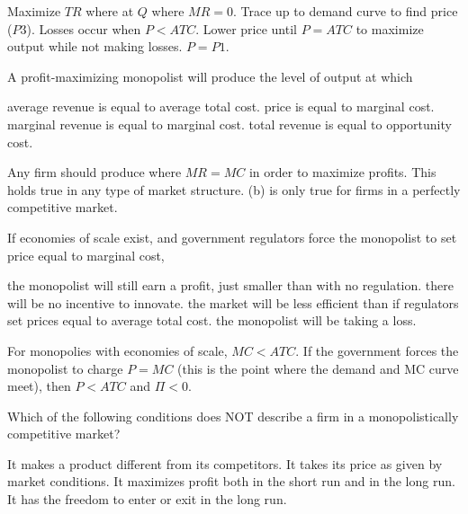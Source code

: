 \documentclass[addpoints,11pt]{exam}
\theoremstyle{definition}
\begin{document}
\begin{questions}
\begin{solution}
	Maximize $TR$ where at $Q$ where $MR = 0$. Trace up to demand curve to find price ($P3$). Losses occur when $P<ATC$. Lower price until $P=ATC$ to maximize output while not making losses. $P = P1$.
\end{solution}

\newpage

	\question A profit-maximizing monopolist will produce the level of output at which
	
	\begin{choices}
		\choice average revenue is equal to average total cost.
		\choice price is equal to marginal cost.
		\CorrectChoice marginal revenue is equal to marginal cost.
		\choice total revenue is equal to opportunity cost.
	\end{choices}
	
	\begin{solution}
		Any firm should produce where $MR = MC$ in order to maximize profits. This holds true in any type of market structure. (b) is only true for firms in a perfectly competitive market.
	\end{solution}
	
	
	\question If economies of scale exist, and government regulators force the monopolist to set price equal to marginal cost,
	
	\begin{choices}
		\choice the monopolist will still earn a profit, just smaller than with no regulation.
		\choice there will be no incentive to innovate.
		\choice the market will be less efficient than if regulators set prices equal to average total cost.
		\CorrectChoice the monopolist will be taking a loss.
	\end{choices}
	
	\begin{solution}
		For monopolies with economies of scale, $MC < ATC$. If the government forces the monopolist to charge $P=MC$ (this is the point where the demand and MC curve meet), then $P<ATC$ and $\Pi <0$.
	\end{solution}


		
		\question Which of the following conditions does NOT describe a firm in a monopolistically competitive market?
		
		\begin{choices}
			\choice It makes a product different from its competitors.
			\CorrectChoice It takes its price as given by market conditions.
			\choice It maximizes profit both in the short run and in the long run.
			\choice It has the freedom to enter or exit in the long run.
		\end{choices}
		

\end{questions}
\end{document}
